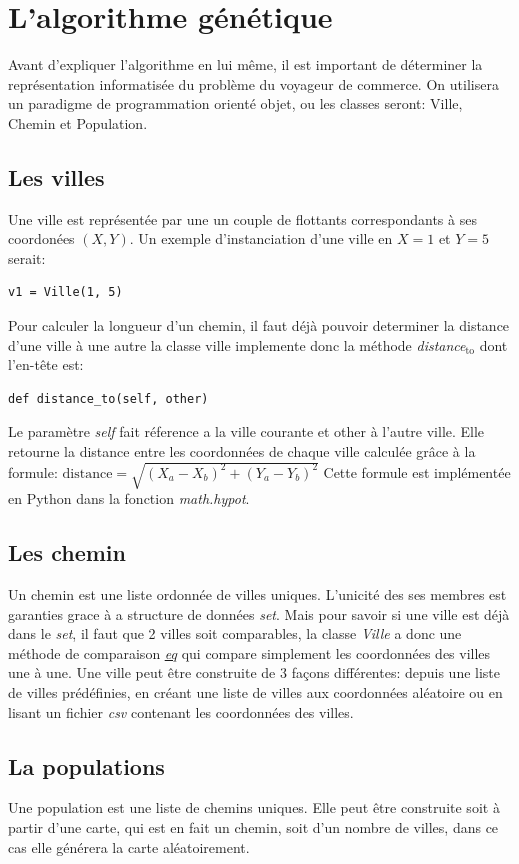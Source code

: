 \documentclass[11pt]{article}
\begin{document}
\section{L'algorithme génétique}
\label{sec-2}
Avant d'expliquer l'algorithme en lui même, il est important de déterminer la représentation informatisée du problème du voyageur de commerce.
On utilisera un paradigme de programmation orienté objet, ou les classes seront: Ville, Chemin et Population.
\subsection{Les villes}
\label{sec-2-1}
Une ville est représentée par une un couple de flottants correspondants à ses coordonées $(X,Y)$. Un exemple d'instanciation d'une ville en $X = 1$ et $Y = 5$ serait:
\begin{verbatim}
v1 = Ville(1, 5)
\end{verbatim}
Pour calculer la longueur d'un chemin, il faut déjà pouvoir determiner la distance d'une ville à une autre
la classe ville implemente donc la méthode \emph{distance$_{\text{to}}$} dont l'en-tête est:
\begin{verbatim}
def distance_to(self, other)
\end{verbatim}

Le paramètre \emph{self} fait réference a la ville courante et other à l'autre ville. Elle retourne la distance entre
les coordonnées de chaque ville calculée grâce à la formule:
$\text{distance} = \sqrt{(X_a-X_b)^2+(Y_a-Y_b)^2}$
Cette formule est implémentée en Python dans la fonction \emph{math.hypot}.

\subsection{Les chemin}
\label{sec-2-2}
Un chemin est une liste ordonnée de villes uniques.
L'unicité des ses membres est garanties grace à a structure de données \emph{set}.
Mais pour savoir si une ville est déjà dans le \emph{set}, il faut que 2 villes soit comparables, la classe
\emph{Ville} a donc une méthode de comparaison \emph{\uline{\uline{eq}}} qui compare simplement les coordonnées des villes une
à une.
Une ville peut être construite de 3 façons différentes: depuis une liste de villes prédéfinies, en créant
une liste de villes aux coordonnées aléatoire ou en lisant un fichier \emph{csv} contenant les coordonnées
des villes. 

\subsection{La populations}
\label{sec-2-3}
Une population est une liste de chemins uniques. Elle peut être construite soit à partir
d'une carte, qui est en fait un chemin, soit d'un nombre de villes, dans ce cas elle générera la
carte aléatoirement.
\end{document}
